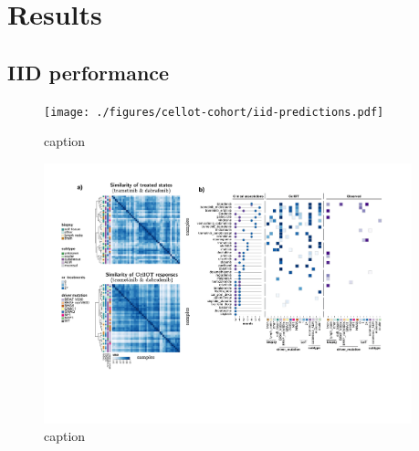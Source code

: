 \section{Results}

\subsection{IID performance}
\begin{figure}[h]
  \begin{center}
    \texttt{[image: ./figures/cellot-cohort/iid-predictions.pdf]}
  \end{center}
  \caption{caption}
  \label{iid-prediction}
\end{figure}

\begin{figure}[h]
  \begin{center}
    \includegraphics[width=0.95\textwidth]{figures/cellot-cohort/iid-associations.pdf}
  \end{center}
  \caption{caption}
  \label{fig:iid-associations}
\end{figure}


